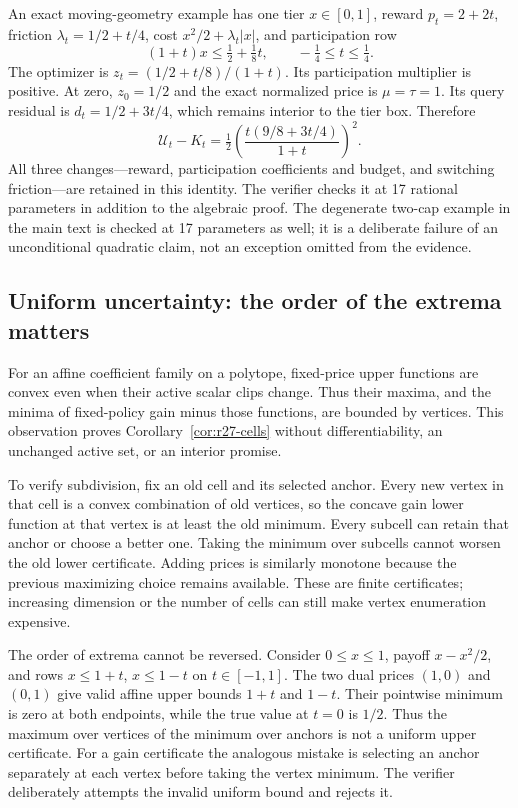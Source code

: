 An exact moving-geometry example has one tier $x\in[0,1]$, reward $p_t=2+2t$, friction $\lambda_t=1/2+t/4$, cost $x^2/2+\lambda_t|x|$, and participation row
\[
 (1+t)x\leq\tfrac12+\tfrac18t,\qquad -\tfrac14\leq t\leq\tfrac14.
\]
The optimizer is $z_t=(1/2+t/8)/(1+t)$. Its participation multiplier is positive. At zero, $z_0=1/2$ and the exact normalized price is $\mu=\tau=1$. Its query residual is $d_t=1/2+3t/4$, which remains interior to the tier box. Therefore
\[
 \mathcal U_t-K_t
 =\tfrac12\left(\frac{t(9/8+3t/4)}{1+t}\right)^2.
\]
All three changes---reward, participation coefficients and budget, and switching friction---are retained in this identity. The verifier checks it at 17 rational parameters in addition to the algebraic proof. The degenerate two-cap example in the main text is checked at 17 parameters as well; it is a deliberate failure of an unconditional quadratic claim, not an exception omitted from the evidence.

\subsection{Uniform uncertainty: the order of the extrema matters}
For an affine coefficient family on a polytope, fixed-price upper functions are convex even when their active scalar clips change. Thus their maxima, and the minima of fixed-policy gain minus those functions, are bounded by vertices. This observation proves Corollary~\ref{cor:r27-cells} without differentiability, an unchanged active set, or an interior promise.

To verify subdivision, fix an old cell and its selected anchor. Every new vertex in that cell is a convex combination of old vertices, so the concave gain lower function at that vertex is at least the old minimum. Every subcell can retain that anchor or choose a better one. Taking the minimum over subcells cannot worsen the old lower certificate. Adding prices is similarly monotone because the previous maximizing choice remains available. These are finite certificates; increasing dimension or the number of cells can still make vertex enumeration expensive.

The order of extrema cannot be reversed. Consider $0\leq x\leq1$, payoff $x-x^2/2$, and rows $x\leq1+t$, $x\leq1-t$ on $t\in[-1,1]$. The two dual prices $(1,0)$ and $(0,1)$ give valid affine upper bounds $1+t$ and $1-t$. Their pointwise minimum is zero at both endpoints, while the true value at $t=0$ is $1/2$. Thus the maximum over vertices of the minimum over anchors is not a uniform upper certificate. For a gain certificate the analogous mistake is selecting an anchor separately at each vertex before taking the vertex minimum. The verifier deliberately attempts the invalid uniform bound and rejects it.

